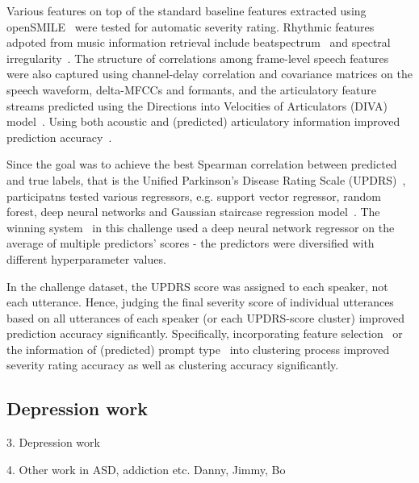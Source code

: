 \documentclass{article}
\begin{document}
Various features on top of the standard baseline features extracted using openSMILE~\cite{eyben2010themunich} were tested for automatic severity rating.
Rhythmic features adpoted from music information retrieval include beatspectrum~\cite{foote2002audio} and spectral irregularity~\cite{jensen1999timbre}.
The structure of correlations among frame-level speech features were also captured using channel-delay correlation and covariance matrices on the speech waveform, delta-MFCCs and formants, and the articulatory feature streams predicted using the Directions into Velocities of Articulators (DIVA) model~\cite{guenther2006neural,williamson2015segment}.
Using both acoustic and (predicted) articulatory information improved prediction accuracy~\cite{hahm2015parkinson}.

Since the goal was to achieve the best Spearman correlation between predicted and true labels, that is the Unified Parkinson's Disease Rating Scale (UPDRS)~\cite{stebbins1998factor}, participatns tested various regressors, e.g. support vector regressor, random forest, deep neural networks and Gaussian staircase regression model~\cite{williamson2013vocal}. The winning system~\cite{grosz2015assessing} in this challenge used a deep neural network regressor on the average of multiple predictors' scores - the predictors were diversified with different hyperparameter values. 

In the challenge dataset, the UPDRS score was assigned to each speaker, not each utterance.
Hence, judging the final severity score of individual utterances based on all utterances of each speaker (or each UPDRS-score cluster) improved prediction accuracy significantly.
Specifically, incorporating feature selection~\cite{grosz2015assessing} or the information of (predicted) prompt type~\cite{kim2015automatic} into clustering process improved severity rating accuracy as well as clustering accuracy significantly.



\subsection{Depression work}

3. Depression work

4. Other work in ASD, addiction etc. 
Danny, Jimmy, Bo
\vfill\pagebreak



\end{document}
